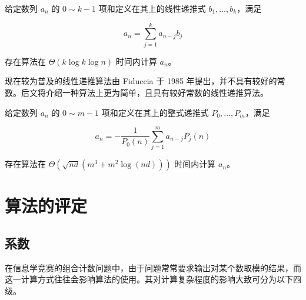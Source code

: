 \begin{theorem}给定数列 $a_n$ 的 $0\sim k-1$ 项和定义在其上的线性递推式 $b_1,\dots, b_k$，满足

$$ a_n = \sum_{j=1}^k a_{n-j} b_j $$

存在算法在 $\Theta(k\log k\log n)$ 时间内计算 $a_n$。
\end{theorem}

现在较为普及的线性递推算法由 Fiduccia 于 1985 年提出，并不具有较好的常数。后文将介绍一种算法上更为简单，且具有较好常数的线性递推算法。

\begin{theorem}给定数列 $a_n$ 的 $0\sim m-1$ 项和定义在其上的整式递推式 $P_0,\dots,P_m$，满足

$$ a_n = -\frac1{P_0(n)}\sum_{j=1}^m a_{n-j}P_j(n) $$

存在算法在 $\Theta \left(\sqrt{nd}\left(m^3+m^2\log(nd)\right)\right)$ 时间内计算 $a_n$。
\end{theorem}

\section{算法的评定}

\subsection{系数}

在信息学竞赛的组合计数问题中，由于问题常常要求输出对某个数取模的结果，而这一计算方式往往会影响算法的使用。其对计算复杂程度的影响大致可分为以下四级。

\begin{center}
\end{center}

